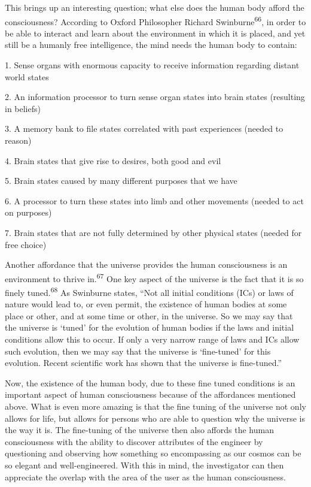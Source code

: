 This brings up an interesting question; what else does the human body
afford the consciousness? According to Oxford Philosopher Richard
Swinburne\textsuperscript{66}, in order to be able to interact and
learn about the environment in which it is placed, and yet still be a
humanly free intelligence, the mind needs the human body to contain:


1. Sense organs with enormous capacity to receive information regarding
distant world states


2. An information processor to turn sense organ states into brain states
(resulting in beliefs)


3. A memory bank to file states correlated with past experiences (needed
to reason)


4. Brain states that give rise to desires, both good and evil


5. Brain states caused by many different purposes that we have


6. A processor to turn these states into limb and other movements
(needed to act on purposes)


7. Brain states that are not fully determined by other physical states
(needed for free choice)


Another affordance that the universe provides the human consciousness is
an environment to thrive in.\textsuperscript{67} One key aspect of the
universe is the fact that it is so finely tuned.\textsuperscript{68} As
Swinburne states, “Not all initial conditions (ICs) or laws of nature
would lead to, or even permit, the existence of human bodies at some
place or other, and at some time or other, in the universe. So we may
say that the universe is ‘tuned’ for the evolution of human bodies if
the laws and initial conditions allow this to occur. If only a very
narrow range of laws and ICs allow such evolution, then we may say that
the universe is ‘fine-tuned’ for this evolution. Recent scientific work
has shown that the universe is fine-tuned.”


Now, the existence of the human body, due to these fine tuned conditions
is an important aspect of human consciousness because of the
affordances mentioned above. What is even more amazing is that the fine
tuning of the universe not only allows for life, but allows for persons
who are able to question why the universe is the way it is. The
fine-tuning of the universe then also affords the human consciousness
with the ability to discover attributes of the engineer by questioning
and observing how something so encompassing as our cosmos can be so
elegant and well-engineered. With this in mind, the investigator can
then appreciate the overlap with the area of the user as the human
consciousness.



